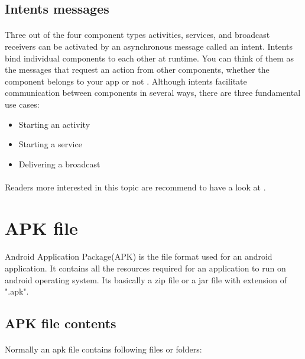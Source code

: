 \documentclass[../main.tex]{subfile}
\begin{document}
		\subsection{Intents messages}\label{sec:intents}
			\paragraph{} Three out of the four component types activities, services, and broadcast receivers can be activated by an asynchronous message called an intent. Intents bind individual components to each other at runtime. You can think of them as the messages that request an action from other components, whether the component belongs to your app or not \cite{app_fundamentals}. Although intents facilitate communication between components in several ways, there are three fundamental use cases:
				\begin{itemize}
					\item Starting an activity
					\item Starting a service
					\item Delivering a broadcast
				\end{itemize}
			\paragraph{} Readers more interested in this topic are recommend to have a look at \cite{intents}.
			
			
	\section{APK file}\label{sec:apk}	
		\paragraph{} Android Application Package(APK) is the file format used for an android application. It contains all the resources required for an application to run on android operating system. Its basically a zip file or a jar file with extension of ".apk"\cite{APK_structure}.
		
		\subsection{APK file contents} \label{sec:apk_file_contents}
		\paragraph{} Normally an apk file contains following files or folders:
		
\end{document}

